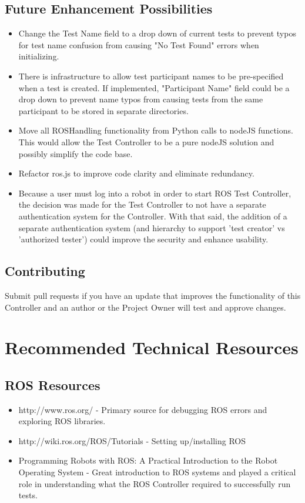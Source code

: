 \documentclass[onecolumn, draftclsnofoot,10pt, compsoc]{report}
\begin{document}
\section{Future Enhancement Possibilities}

\begin{itemize}
	\item Change the Test Name field to a drop down of current tests to prevent typos for test name confusion from causing "No Test Found" errors when initializing.

	\item There is infrastructure to allow test participant names to be pre-specified when a test is created. If implemented, "Participant Name" field could be a drop down to prevent name typos from causing tests from the same participant to be stored in separate directories.

	\item Move all ROSHandling functionality from Python calls to nodeJS functions. This would allow the Test Controller to be a pure nodeJS solution and possibly simplify the code base.

	\item Refactor ros.js to improve code clarity and eliminate redundancy.

	\item Because a user must log into a robot in order to start ROS Test Controller, the decision was made for the Test Controller to not have a separate authentication system for the Controller. With that said, the addition of a separate authentication system (and hierarchy to support 'test creator' vs 'authorized tester') could improve the security and enhance usability.
\end{itemize}

\section{Contributing}

Submit pull requests if you have an update that improves the functionality of this Controller and an author or the Project Owner will test and approve changes.

\chapter{Recommended Technical Resources}
\minitoc
\section{ROS Resources}
\begin{itemize}
	\item http://www.ros.org/ - Primary source for debugging ROS errors and exploring ROS libraries.
	\item http://wiki.ros.org/ROS/Tutorials - Setting up/installing ROS
	\item Programming Robots with ROS: A Practical Introduction to the Robot Operating System - Great introduction to ROS systems and played a critical role in understanding what the ROS Controller required to successfully run tests.
\end{itemize}
\end{document}
